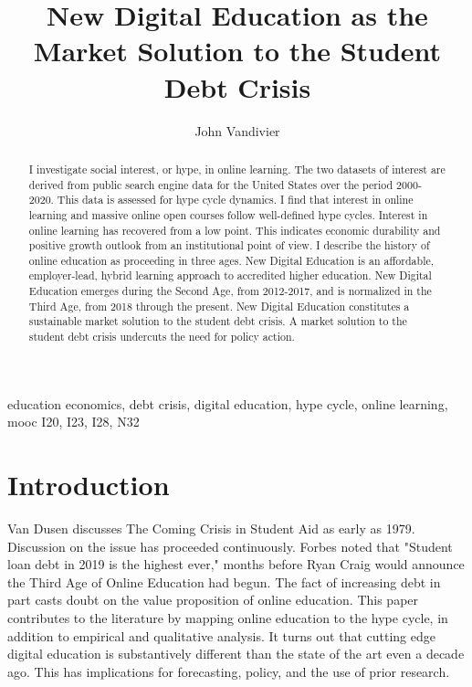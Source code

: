 \documentclass[review]{elsarticle}
\begin{document}
\begin{frontmatter}

    \title{
        New Digital Education as the Market Solution to the Student Debt Crisis
    }


    \author[mymainaddress]{John Vandivier}
    \address[mymainaddress]{4400 University Dr, Fairfax, VA 22030}

    \begin{abstract}
        I investigate social interest, or hype, in online learning.
        The two datasets of interest are derived from public search engine data for the United States over the period 2000-2020.
        This data is assessed for hype cycle dynamics.
        I find that interest in online learning and massive online open courses follow well-defined hype cycles.
        Interest in online learning has recovered from a low point.
        This indicates economic durability and positive growth outlook from an institutional point of view.
        I describe the history of online education as proceeding in three ages.
        New Digital Education is an affordable, employer-lead, hybrid learning approach to accredited higher education.
        New Digital Education emerges during the Second Age, from 2012-2017, and is normalized in the Third Age, from 2018 through the present.
        New Digital Education constitutes a sustainable market solution to the student debt crisis.
        A market solution to the student debt crisis undercuts the need for policy action.
    \end{abstract}

    \begin{keyword}
        education economics, debt crisis, digital education, hype cycle, online learning, mooc
        \MSC[2010] I20, I23, I28, N32
    \end{keyword}

\end{frontmatter}

\pagebreak
\linenumbers

\section{Introduction}

Van Dusen discusses The Coming Crisis in Student Aid as early as 1979\cite{van1979coming}.
Discussion on the issue has proceeded continuously.
Forbes\cite{friedman2019student} noted that "Student loan debt in 2019 is the highest ever,"
months before Ryan Craig would announce the Third Age of Online Education had begun\cite{craig2019welcome}.
The fact of increasing debt in part casts doubt on the value proposition of online education.
This paper contributes to the literature by mapping online education to the hype cycle, in addition to empirical and qualitative analysis.
It turns out that cutting edge digital education is substantively different than the state of the art even a decade ago.
This has implications for forecasting, policy, and the use of prior research.
\end{document}
